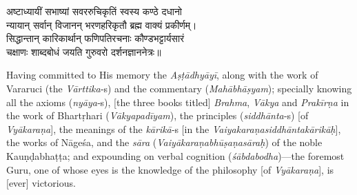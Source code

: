 \begin{center}
अष्टाध्यायीं सभाष्यां सवररुचिकृतिं स्वस्य कण्ठे दधानो\nopagebreak\\
न्यायान् सर्वान् विजानन् भरणहरिकृतौ ब्रह्म वाक्यं प्रकीर्णम्।\\
सिद्धान्तान् कारिकार्थान् फणिपतिरचनाः कौण्डभट्टार्यसारं\nopagebreak\\
चक्षाणः शाब्दबोधं जयति गुरुवरो दर्शनज्ञाननेत्रः॥\\
\end{center}
\begin{sloppypar}\justifying\noindent\hspace{10mm} {\engtextfont \lqtwo Having committed to His memory the \textit{Aṣṭādhyāyī}, along with the work of Vararuci (the \textit{Vārttika}‑s) and the commentary (\textit{Mahābhāṣyam}); specially knowing all the axioms (\textit{nyāya}‑s), [the three books titled] \textit{Brahma}, \textit{Vākya} and \textit{Prakīrṇa} in the work of Bhartṛhari (\textit{Vākyapadīyam}), the principles (\textit{siddhānta}‑s) [of \textit{Vyākaraṇa}], the meanings of the \textit{kārikā}‑s [in the \textit{Vaiyakaraṇa\-siddhānta\-kārikāḥ}], the works of Nāgeśa, and the \textit{sāra} (\textit{Vaiyākaraṇa\-bhūṣaṇa\-sāraḥ}) of the noble Kauṇḍabhaṭṭa; and expounding on verbal cognition (\textit{śābdabodha})—the foremost Guru, one of whose eyes is the knowledge of the philosophy [of \textit{Vyākaraṇa}], is [ever] victorious.\rqtwo}\end{sloppypar}
